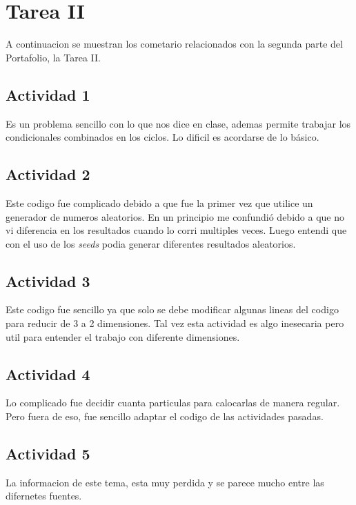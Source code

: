 \documentclass[12pt,letterpaper]{article}
\begin{document}
\pagebreak

\section{Tarea II}
A continuacion se muestran  los cometario relacionados con la segunda parte del Portafolio, la Tarea II.
\vspace{-0.5cm}

\subsection*{Actividad 1}
Es un problema sencillo con lo que nos dice en clase, ademas permite trabajar los condicionales combinados en los ciclos. Lo dificil es acordarse de lo básico.


\subsection*{Actividad 2}
Este codigo fue complicado debido a que fue la primer vez que utilice un generador de numeros aleatorios. En un principio me confundió debido a que no vi diferencia en los resultados cuando lo corri multiples veces. Luego entendi que con el uso de los \textit{seeds} podia generar diferentes resultados aleatorios.


\subsection*{Actividad 3}
Este codigo fue sencillo ya que solo se debe modificar algunas lineas del codigo para reducir de 3 a 2 dimensiones. Tal vez esta actividad es algo inesecaria pero util para entender el trabajo con diferente dimensiones.



\subsection*{Actividad 4}
Lo complicado fue decidir cuanta particulas para calocarlas de manera regular. Pero fuera de eso, fue sencillo adaptar el codigo de las actividades pasadas.


\subsection*{Actividad 5}
La informacion de este tema, esta muy perdida y se parece mucho entre las difernetes fuentes. 
\end{document}
